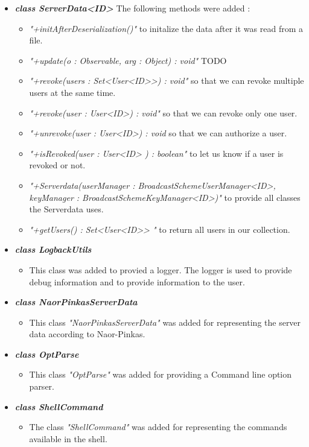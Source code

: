 \documentclass[a4paper,10pt]{scrartcl}
\begin{document}
\begin{itemize}
	\item \textbf{\textit{class ServerData<ID>}}\newline
	The following methods were added :
  \begin{itemize}
 	 \item \textit{"+initAfterDeserialization()"} to initalize the data after it was read from a file.
	 \item \textit{"+update(o : Observable, arg : Object) : void"} TODO
	 \item \textit{"+revoke(users : Set<User<ID>>) : void"} so that we can revoke multiple users at the same time.
	 \item \textit{"+revoke(user : User<ID>) : void"} so that we can revoke only one user.
	 \item \textit{"+unrevoke(user : User<ID>) : void} so that we can authorize a user.
	 \item \textit{"+isRevoked(user : User<ID> ) : boolean"} to let us know if a user is revoked or not.
	 \item \textit{"+Serverdata(userManager : BroadcastSchemeUserManager<ID>, keyManager :  BroadcastSchemeKeyManager<ID>)"} 
		to provide all classes the Serverdata uses.
	 \item \textit{"+getUsers() : Set<User<ID>> "} to return all users in our collection.
	\end{itemize}

   \item \textbf{\textit{class LogbackUtils}}
	\begin{itemize}
	 \item This class was added to provied a logger. The logger is used to provide debug information and to provide information to the user.
	\end{itemize}
	
	 \item \textbf{\textit{class NaorPinkasServerData}}
	\begin{itemize}
	 \item This class \textit{"NaorPinkasServerData"} was added for representing the server data according to Naor-Pinkas.
	\end{itemize}
	
	 \item \textbf{\textit{class OptParse}}
	\begin{itemize}
	 \item This class \textit{"OptParse"} was added for providing a Command line option parser.
	\end{itemize}
	
   \item \textit{\textbf{class ShellCommand}}
	\begin{itemize}
	 \item The class \textit{"ShellCommand"} was added for representing the commands available in the shell.
	\end{itemize}
	
\end{itemize}
\end{document}
